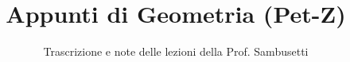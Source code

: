 \documentclass[a4paper,12pt]{article}
\title{Appunti di Geometria (Pet-Z)}
\author{Trascrizione e note delle lezioni della Prof. Sambusetti}
\date{}
\begin{document}
\maketitle
\projectintro
\tableofcontents
\newpage

\end{document}
